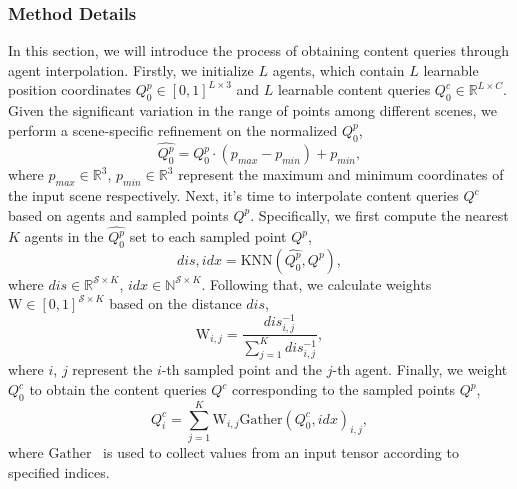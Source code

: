 \subsubsection{Method Details} 
In this section, we will introduce the process of obtaining content queries through agent interpolation. Firstly, we initialize $L$ agents, which contain $L$ learnable position coordinates $Q^p_0\in[0,1]^{L\times 3}$ and $L$ learnable content queries $Q^c_0\in\mathbb{R} ^{L\times C}$. Given the significant variation in the range of points among different scenes, we perform a scene-specific refinement on the normalized $Q^p_0$, 
\begin{equation}
  \label{refinement}
  \widehat{Q^p_0} = Q^p_0\cdot (p_{max}-p_{min}) + p_{min},
\end{equation}
where $p_{max}\in\mathbb{R}^3$, $p_{min}\in\mathbb{R}^3$ represent the maximum and minimum coordinates of the input scene respectively.
Next, it's time to interpolate content queries $Q^c$ based on agents and sampled points $Q^p$. Specifically, we first compute the nearest $K$ agents in the $\widehat{Q^p_0}$ set to each sampled point $Q^p$,
\begin{equation}
  \label{knn}
  dis, idx = \text{KNN}(\widehat{Q^p_0}, Q^p),
\end{equation}
where $dis \in \mathbb{R}^{\mathcal{S} \times K}$, $idx \in \mathbb{N}^{\mathcal{S} \times K}$.
Following that, we calculate weights $\text{W}\in[0,1]^{\mathcal{S} \times K}$ based on the distance $dis$,
\begin{equation}
  \label{weight}
  \text{W}_{i,j} = \frac{dis^{-1}_{i,j}}{\sum_{j = 1}^{K}dis^{-1}_{i,j} },
\end{equation}
where $i$, $j$ represent the $i$-th sampled point and the $j$-th agent.
Finally, we weight $Q^c_0$ to obtain the content queries $Q^c$ corresponding to the sampled points $Q^p$,
\begin{equation}
  \label{Q^c}
  Q^c_i = \sum_{j = 1}^{K}\text{W}_{i,j}\text{Gather}(Q^c_0,idx)_{i,j},
\end{equation}
where $\text{Gather}$~\cite{paszke2019pytorch} is used to collect values from an input tensor according to specified indices.

